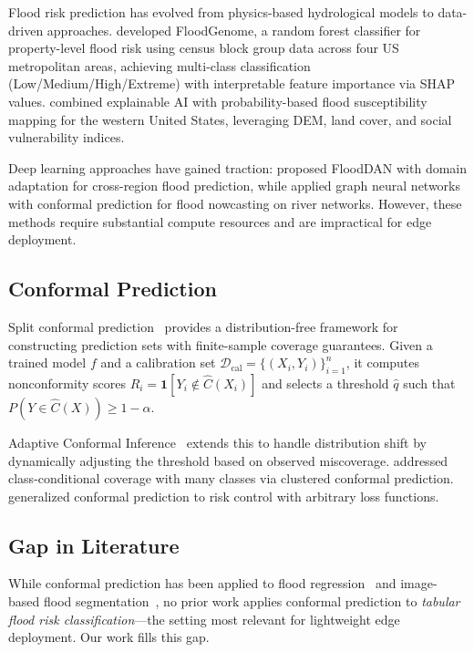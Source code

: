\documentclass{article}
\begin{document}
Flood risk prediction has evolved from physics-based hydrological models to data-driven approaches. \citet{floodgenome2025} developed FloodGenome, a random forest classifier for property-level flood risk using census block group data across four US metropolitan areas, achieving multi-class classification (Low/Medium/High/Extreme) with interpretable feature importance via SHAP values. \citet{flood_susceptibility2025} combined explainable AI with probability-based flood susceptibility mapping for the western United States, leveraging DEM, land cover, and social vulnerability indices.

Deep learning approaches have gained traction: \citet{flooddan2022} proposed FloodDAN with domain adaptation for cross-region flood prediction, while \citet{gnn_flood2026} applied graph neural networks with conformal prediction for flood nowcasting on river networks. However, these methods require substantial compute resources and are impractical for edge deployment.

\subsection{Conformal Prediction}

Split conformal prediction~\cite{split_conformal2018, lei2018} provides a distribution-free framework for constructing prediction sets with finite-sample coverage guarantees. Given a trained model $f$ and a calibration set $\mathcal{D}_{\text{cal}} = \{(X_i, Y_i)\}_{i=1}^n$, it computes nonconformity scores $R_i = \mathbf{1}[Y_i \notin \hat{C}(X_i)]$ and selects a threshold $\hat{q}$ such that $P(Y \in \hat{C}(X)) \geq 1 - \alpha$.

Adaptive Conformal Inference~\cite{aci2021} extends this to handle distribution shift by dynamically adjusting the threshold based on observed miscoverage. \citet{class_conditional2023} addressed class-conditional coverage with many classes via clustered conformal prediction. \citet{conformal_risk_control2022} generalized conformal prediction to risk control with arbitrary loss functions.

\subsection{Gap in Literature}

While conformal prediction has been applied to flood regression~\cite{extreme_conformal2025} and image-based flood segmentation~\cite{gnn_flood2026}, no prior work applies conformal prediction to \textit{tabular flood risk classification}---the setting most relevant for lightweight edge deployment. Our work fills this gap.
\end{document}

